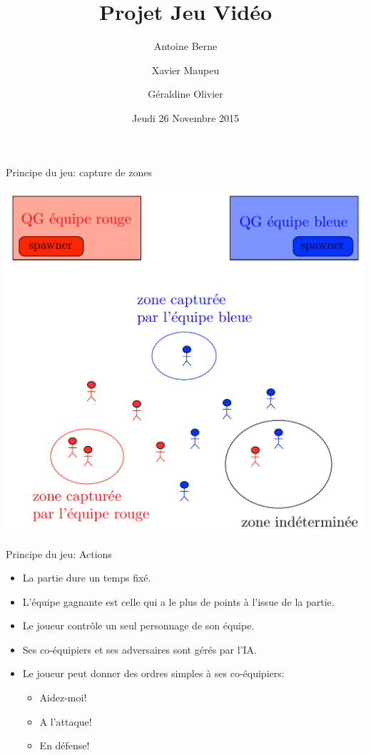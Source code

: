 \documentclass[10pt]{beamer}
\title[JV 2015] %
{Projet Jeu Vid\'eo}
\author[A. Berne, X. Mapeu, G. Olivier] %
{Antoine Berne \and Xavier Maupeu 
\and G\'eraldine Olivier
\medskip
}
\date[Novembre 2012] %
{Jeudi 26 Novembre 2015}
\begin{document}
\begin{frame}[plain]
  \titlepage
  
\end{frame}




\begin{frame}{Principe du jeu: capture de zones}

\begin{center}
\includegraphics[width=0.75\linewidth]{./zones.pdf}
\end{center}
\end{frame}



\begin{frame}{Principe du jeu: Actions}

\begin{itemize}
\item La partie dure un temps fix\'e. 

\medskip


\item L'\'equipe gagnante est celle qui a le plus de points \`a l'issue de la partie.

\medskip


\item Le joueur contr\^ole un seul personnage de son \'equipe.

\medskip


\item Ses co-\'equipiers et ses adversaires sont g\'er\'es par l'IA.

\medskip

\item Le joueur peut donner des ordres simples \`a ses co-\'equipiers:
\begin{itemize}
\item Aidez-moi!
\item A l'attaque!
\item En d\'efense!
\end{itemize}

\end{itemize}

\end{frame}
\end{document}
